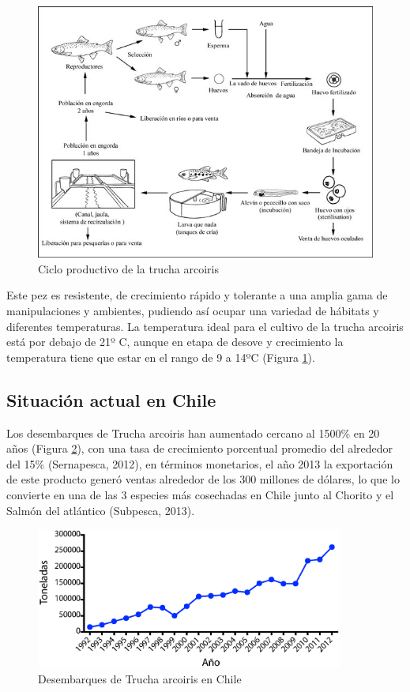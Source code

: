 \documentclass[12pt,letterpaper,oneside]{scrbook}
\begin{document}
\begin{figure}[h!]
    \centering
    \includegraphics[width=15cm]{1} 
    \caption {Ciclo productivo de la trucha arcoiris}
    \label {fig:ciclo}
\end{figure}

Este pez es resistente, de crecimiento rápido y tolerante a una amplia
gama de manipulaciones y ambientes, pudiendo así ocupar una variedad de
hábitats y diferentes temperaturas. La temperatura ideal para el cultivo
de la trucha arcoiris está por debajo de 21º C, aunque en etapa de
desove y crecimiento la temperatura tiene que estar en el rango de 9 a
14ºC (Figura \ref{fig:ciclo}).

\subsection{Situación actual en Chile}

Los desembarques de Trucha arcoiris han aumentado cercano al 1500\% en
20 años (Figura \ref{desembarques}), con una tasa de crecimiento
porcentual promedio del alrededor del 15\% (Sernapesca, 2012), en
términos monetarios, el año 2013 la exportación de este producto generó
ventas alrededor de los 300 millones de dólares, lo que lo convierte en
una de las 3 especies más cosechadas en Chile junto al Chorito y el
Salmón del atlántico (Subpesca, 2013).

\begin{figure}[h]
    \centering
    \includegraphics[width=0.9\textwidth]{desembarques.eps}
    \caption{Desembarques de Trucha arcoiris en Chile} \label{desembarques}
\end{figure}
\end{document}
